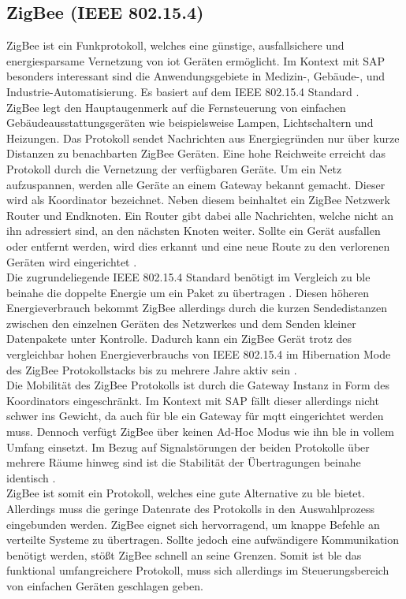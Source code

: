 \subsection{ZigBee (IEEE 802.15.4)}
\label{ss:vergleich:zigbee}

\noindent ZigBee ist ein Funkprotokoll, welches eine günstige, ausfallsichere und energiesparsame Vernetzung von \ac{iot} Geräten ermöglicht. Im Kontext mit SAP besonders interessant sind die Anwendungsgebiete in Medizin-, Gebäude-, und Industrie-Automatisierung. Es basiert auf dem IEEE 802.15.4 Standard \cite[Seite 195]{Gessler15:WNN}.\\  
\noindent ZigBee legt den Hauptaugenmerk auf die Fernsteuerung von einfachen Gebäudeausstattungsgeräten wie beispielsweise Lampen, Lichtschaltern und Heizungen. Das Protokoll sendet Nachrichten aus Energiegründen nur über kurze Distanzen zu benachbarten ZigBee Geräten. Eine hohe Reichweite erreicht das Protokoll durch die Vernetzung der verfügbaren Geräte. Um ein Netz aufzuspannen, werden alle Geräte an einem Gateway bekannt gemacht. Dieser wird als Koordinator bezeichnet. Neben diesem beinhaltet ein ZigBee Netzwerk Router und Endknoten. Ein Router gibt dabei alle Nachrichten, welche nicht an ihn adressiert sind, an den nächsten Knoten weiter. Sollte ein Gerät ausfallen oder entfernt werden, wird dies erkannt und eine neue Route zu den verlorenen Geräten wird eingerichtet \cite{ZIG20:WWW}.\\
\noindent Die zugrundeliegende IEEE 802.15.4 Standard benötigt im Vergleich zu \ac{ble} beinahe die doppelte Energie um ein Paket zu übertragen \cite[Seite 4]{Fafoutis16:BOI}. Diesen höheren Energieverbrauch bekommt ZigBee allerdings durch die kurzen Sendedistanzen zwischen den einzelnen Geräten des Netzwerkes und dem Senden kleiner Datenpakete unter Kontrolle. Dadurch kann ein ZigBee Gerät trotz des vergleichbar hohen Energieverbrauchs von IEEE 802.15.4 im Hibernation Mode des ZigBee Protokollstacks bis zu mehrere Jahre aktiv sein \cite[Seite 267]{Gessler15:WNN}.\\
\noindent Die Mobilität des ZigBee Protokolls ist durch die Gateway Instanz in Form des Koordinators eingeschränkt. Im Kontext mit SAP fällt dieser allerdings nicht schwer ins Gewicht, da auch für \ac{ble} ein Gateway für \ac{mqtt} eingerichtet werden muss. Dennoch verfügt ZigBee über keinen Ad-Hoc Modus wie ihn \ac{ble} in vollem Umfang einsetzt. Im Bezug auf Signalstörungen der beiden Protokolle über mehrere Räume hinweg sind ist die Stabilität der Übertragungen beinahe identisch \cite[Seite 6]{Fafoutis16:BOI}.\\
\noindent ZigBee ist somit ein Protokoll, welches eine gute Alternative zu \ac{ble} bietet. Allerdings muss die geringe Datenrate des Protokolls in den Auswahlprozess eingebunden werden. ZigBee eignet sich hervorragend, um knappe Befehle an verteilte Systeme zu übertragen. Sollte jedoch eine aufwändigere Kommunikation benötigt werden, stößt ZigBee schnell an seine Grenzen. Somit ist \ac{ble} das funktional umfangreichere Protokoll, muss sich allerdings im Steuerungsbereich von einfachen Geräten geschlagen geben.\\


